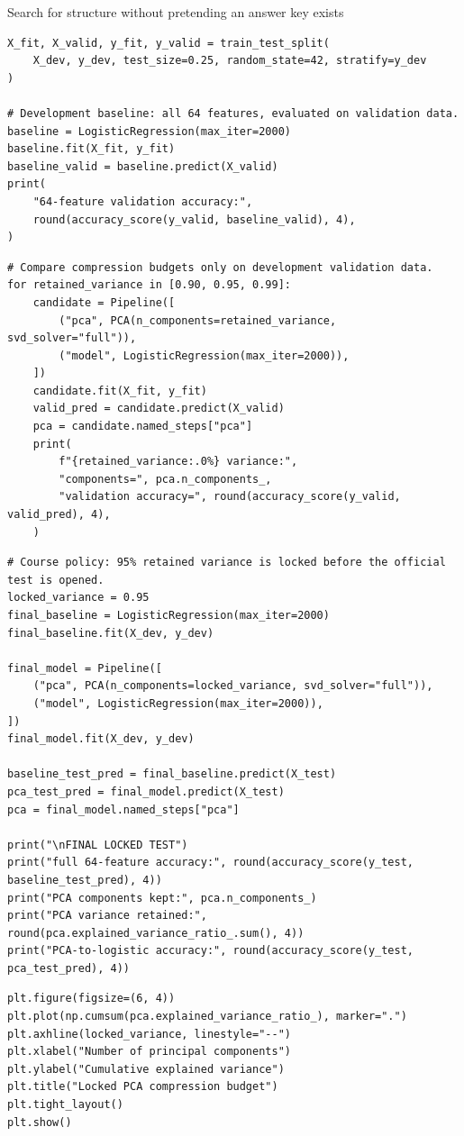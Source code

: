 \begin{labproject}{Search for structure without pretending an answer key exists}
\begin{lstlisting}[style=mlpython]
X_fit, X_valid, y_fit, y_valid = train_test_split(
    X_dev, y_dev, test_size=0.25, random_state=42, stratify=y_dev
)

# Development baseline: all 64 features, evaluated on validation data.
baseline = LogisticRegression(max_iter=2000)
baseline.fit(X_fit, y_fit)
baseline_valid = baseline.predict(X_valid)
print(
    "64-feature validation accuracy:",
    round(accuracy_score(y_valid, baseline_valid), 4),
)
\end{lstlisting}

\begin{lstlisting}[style=mlpython]
# Compare compression budgets only on development validation data.
for retained_variance in [0.90, 0.95, 0.99]:
    candidate = Pipeline([
        ("pca", PCA(n_components=retained_variance, svd_solver="full")),
        ("model", LogisticRegression(max_iter=2000)),
    ])
    candidate.fit(X_fit, y_fit)
    valid_pred = candidate.predict(X_valid)
    pca = candidate.named_steps["pca"]
    print(
        f"{retained_variance:.0%} variance:",
        "components=", pca.n_components_,
        "validation accuracy=", round(accuracy_score(y_valid, valid_pred), 4),
    )
\end{lstlisting}

\begin{lstlisting}[style=mlpython]
# Course policy: 95% retained variance is locked before the official test is opened.
locked_variance = 0.95
final_baseline = LogisticRegression(max_iter=2000)
final_baseline.fit(X_dev, y_dev)

final_model = Pipeline([
    ("pca", PCA(n_components=locked_variance, svd_solver="full")),
    ("model", LogisticRegression(max_iter=2000)),
])
final_model.fit(X_dev, y_dev)

baseline_test_pred = final_baseline.predict(X_test)
pca_test_pred = final_model.predict(X_test)
pca = final_model.named_steps["pca"]

print("\nFINAL LOCKED TEST")
print("full 64-feature accuracy:", round(accuracy_score(y_test, baseline_test_pred), 4))
print("PCA components kept:", pca.n_components_)
print("PCA variance retained:", round(pca.explained_variance_ratio_.sum(), 4))
print("PCA-to-logistic accuracy:", round(accuracy_score(y_test, pca_test_pred), 4))
\end{lstlisting}

\begin{lstlisting}[style=mlpython]
plt.figure(figsize=(6, 4))
plt.plot(np.cumsum(pca.explained_variance_ratio_), marker=".")
plt.axhline(locked_variance, linestyle="--")
plt.xlabel("Number of principal components")
plt.ylabel("Cumulative explained variance")
plt.title("Locked PCA compression budget")
plt.tight_layout()
plt.show()
\end{lstlisting}


\end{labproject}
